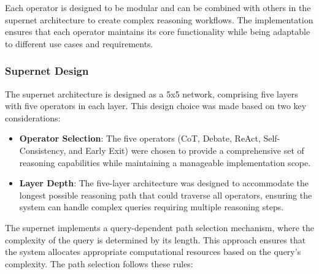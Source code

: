 \documentclass[../Main.tex]{subfiles}
\begin{document}
Each operator is designed to be modular and can be combined with others in the supernet architecture to create complex reasoning workflows. The implementation ensures that each operator maintains its core functionality while being adaptable to different use cases and requirements.

\subsubsection{Supernet Design}
\label{section:5.1.3.2_supernet_design}
The supernet architecture is designed as a 5x5 network, comprising five layers with five operators in each layer. This design choice was made based on two key considerations:


\begin{itemize}
    \item \textbf{Operator Selection}: The five operators (CoT, Debate, ReAct, Self-Consistency, and Early Exit) were chosen to provide a comprehensive set of reasoning capabilities while maintaining a manageable implementation scope.
    
    \item \textbf{Layer Depth}: The five-layer architecture was designed to accommodate the longest possible reasoning path that could traverse all operators, ensuring the system can handle complex queries requiring multiple reasoning steps.
\end{itemize}

The supernet implements a query-dependent path selection mechanism, where the complexity of the query is determined by its length. This approach ensures that the system allocates appropriate computational resources based on the query's complexity. The path selection follows these rules:
\end{document}

